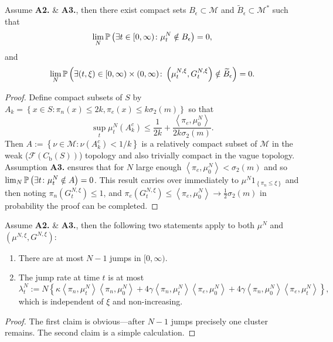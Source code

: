 \begin{lemma}\label{lemma: cpct contain}
Assume \textbf{A2.} \& \textbf{A3.}, then there exist compact sets $B_\epsilon \subset \mathcal{M}$ and $\widetilde{B}_\epsilon \subset \mathcal{M}^\ast$ such that
\begin{equation*}
    \lim_N \mathbb{P}\left(\exists t \in [0,\infty) \colon \mu^N_t \notin B_\epsilon \right) = 0,
\end{equation*}
and
\begin{equation*}
    \lim_N \mathbb{P}\left(\exists (t,\xi) \in [0,\infty)\times (0,\infty) \colon \left({\mu}^{N,\xi}_t, G^{N,\xi}_t\right) \notin \widetilde{B}_\epsilon \right) = 0.
\end{equation*}
\end{lemma}
\begin{proof}
Define compact subsets of $S$ by $A_k = \left\{x\in S \colon \pi_n(x) \leq 2k, \pi_e(x) \leq k \sigma_2(m)\right\}$ so that
\begin{equation*}
    \sup_t \mu_t^N\left(A_k^c\right) \leq \frac{1}{2k} + \frac{\left<\pi_e, \mu_0^N\right>}{2k \sigma_2(m)}.
\end{equation*}
Then $A:= \left\{\nu\in \mathcal{M} \colon \nu\left(A_k^c\right) < 1/k \right\}$ is a relatively compact subset of $\mathcal{M}$ in the weak ($\mathcal{F}(C_\mathrm{b}(S))$) topology and also trivially compact in the vague topology.
Assumption \textbf{A3.} ensures that for $N$ large enough $\left<\pi_e, \mu_0^N\right> < \sigma_2(m)$ and so $\lim_N \mathbb{P}\left(\exists t \colon \mu_t^N \notin A\right) = 0$.
This result carries over immediately to $\mu^N 1_{\left\{\pi_n \leq \xi\right\}}$ and then noting $\pi_n\left(G^{N,\xi}_t\right) \leq 1$, and $\pi_e\left(G^{N,\xi}_t\right) \leq \left<\pi_e, \mu_0^N \right> \rightarrow \frac12 \sigma_2(m)$ in probability the proof can be completed.
\end{proof}

\begin{lemma}\label{lemma: bdd jump rate}
Assume \textbf{A2.} \& \textbf{A3.}, then the following two statements apply to both $\mu^N$ and $\left({\mu}^{N,\xi}, G^{N,\xi}\right)$:
\begin{enumerate}
    \item There are at most $N-1$ jumps in $[0,\infty)$.
    \item The jump rate at time $t$ is at most
    \begin{equation*}
        \lambda^N_t := N\left\{\kappa \left<\pi_n, \mu_t^N\right> \left<\pi_n, \mu_0^N\right>
        +4 \gamma  \left<\pi_n, \mu_t^N\right> \left<\pi_e, \mu_0^N\right>
        +4 \gamma  \left<\pi_n, \mu_0^N\right> \left<\pi_e, \mu_t^N\right>\right\},
    \end{equation*}
    which is independent of $\xi$ and non-increasing.
\end{enumerate}
\end{lemma}
\begin{proof}
The first claim is obvious---after $N-1$ jumps precisely one cluster remains.  The second claim is a simple calculation.
\end{proof}

